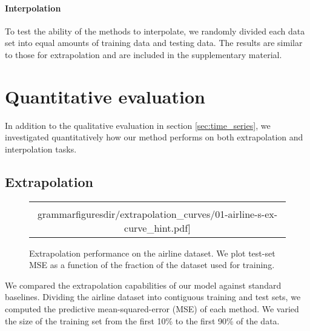 \paragraph{Interpolation}
To test the ability of the methods to interpolate, we randomly divided each data set into equal amounts of training data and testing data.
The results are similar to those for extrapolation and are included in the supplementary material.




\section{Quantitative evaluation}
\label{sec:quantitative}

In addition to the qualitative evaluation in section \ref{sec:time_series}, we investigated quantitatively how our method performs on both extrapolation and interpolation tasks.

\subsection{Extrapolation}


\begin{figure}
\centering
\begin{tabular}{c}
\hspace{-0.5cm}
\texttt{[image: \\grammarfiguresdir/extrapolation\_curves/01-airline-s-ex-curve\_hint.pdf]}
\end{tabular}
\caption[Comparison of extrapolation performance]
{Extrapolation performance on the airline dataset.  We plot test-set MSE as a function of the fraction of the dataset used for training. 
}
\label{fig:extrapolation}
\end{figure}

We compared the extrapolation capabilities of our model against standard baselines\footnotemark.
Dividing the airline dataset into contiguous training and test sets, we computed the predictive mean-squared-error (MSE) of each method.
We varied the size of the training set from the first 10\% to the first 90\% of the data.

